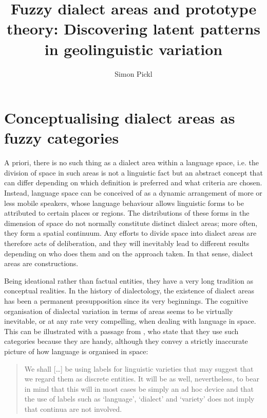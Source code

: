 \documentclass[output=paper]{LSP/langsci}
\author{Simon Pickl}
\title{Fuzzy dialect areas and prototype theory: Discovering latent patterns in geolinguistic variation}
\begin{document}
 
 
  
\section{Conceptualising dialect areas as fuzzy categories}

A priori, there is no such thing as a dialect area within a language space, i.e. the division of space in such areas is not a linguistic fact but an abstract concept that can differ depending on which definition is preferred and what criteria are chosen. Instead, language space can be conceived of as a dynamic arrangement of more or less mobile speakers, whose language behaviour allows linguistic forms to be attributed to certain places or regions. The distributions of these forms in the dimension of space do not normally constitute distinct dialect areas; more often, they form a spatial continuum. Any efforts to divide space into dialect areas are therefore acts of deliberation, and they will inevitably lead to different results depending on who does them and on the approach taken. In that sense, dialect areas are constructions.

Being ideational rather than factual entities, they have a very long tradition as conceptual realities. In the history of dialectology, the existence of dialect areas has been a permanent presupposition since its very beginnings. The cognitive organisation of dialectal variation in terms of areas seems to be virtually inevitable, or at any rate very compelling, when dealing with language in space. This can be illustrated with a passage from \citet{chambers_dialectology_1998}, who state that they use such categories because they are handy, although they convey a strictly inaccurate picture of how language is organised in space:

\begin{quote}
We shall […] be using labels for linguistic varieties that may suggest that we regard them as discrete entities. It will be as well, nevertheless, to bear in mind that this will in most cases be simply an ad hoc device and that the use of labels such as ‘language’, ‘dialect’ and ‘variety’ does not imply that continua are not involved.\\
\citep[12]{chambers_dialectology_1998}
\end{quote}
\end{document}
